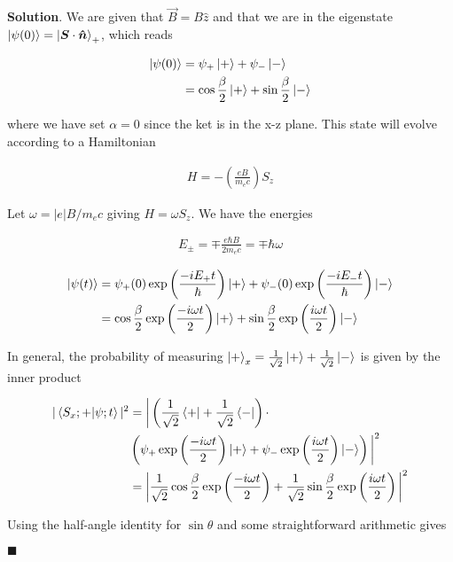 \documentclass[12pt]{article}
\theoremstyle{definition}
\newenvironment{s}{%
        \begin{trivlist} \item \textbf{Solution}. }{%
            \hspace*{\fill} $\blacksquare$\end{trivlist}}%
\begin{document}
{\begin{s}
We are given that $\vec{B} = B\hat{z}$ and that we are in the eigenstate $\ket{\psi(0)} = \ket{\bm{S}\cdot \bm{\hat{n}}}_{+}$, which reads

\begin{align*}
\ket{\psi(0)} &= \psi_{+}\ket{+} + \psi_{-}\ket{-}\\
&= \cos{\frac{\beta}{2}}\ket{+} + \sin{\frac{\beta}{2}}\ket{-}\\
\end{align*}

where we have set $\alpha=0$ since the ket is in the x-z plane. This state will evolve according to a Hamiltonian

\begin{align*}
H = -\left(\frac{eB}{m_{e}c}\right)S_{z}
\end{align*}

Let $\omega = |e|B/m_{e}c$ giving $H=\omega S_{z}$. We have the energies

\begin{align*}
E_{\pm} = \mp \frac{e\hbar B}{2m_{e}c} = \mp \hbar\omega
\end{align*}

\begin{align*}
\ket{\psi(t)} &= \psi_{+}(0)\exp\left(\frac{-iE_{+}t}{\hbar}\right)\ket{+} + \psi_{-}(0)\exp\left(\frac{-iE_{-}t}{\hbar}\right)\ket{-}\\
&= \cos{\frac{\beta}{2}}\exp\left(\frac{-i\omega t}{2}\right)\ket{+} + \sin{\frac{\beta}{2}}\exp\left(\frac{i\omega t}{2}\right)\ket{-}
\end{align*}

In general, the probability of measuring $\ket{+}_{x} = \frac{1}{\sqrt{2}}\ket{+} + \frac{1}{\sqrt{2}}\ket{-}$ is given by the inner product

\begin{align*}
|\bra{S_{x};+}\ket{\psi;t}|^{2} &= \bigg|\left(\frac{1}{\sqrt{2}}\bra{+} + \frac{1}{\sqrt{2}}\bra{-}\right)\cdot\\
&\left(\psi_{+}\exp\left(\frac{-i\omega t}{2}\right)\ket{+} + \psi_{-}\exp\left(\frac{i\omega t}{2}\right)\ket{-}\right)\bigg|^{2}\\
&= \bigg|\frac{1}{\sqrt{2}}\cos\frac{\beta}{2}\exp\left(\frac{-i\omega t}{2}\right)+\frac{1}{\sqrt{2}}\sin\frac{\beta}{2}\exp\left(\frac{i\omega t}{2}\right)\bigg|^{2}
\end{align*}

Using the half-angle identity for $\sin\theta$ and some straightforward arithmetic gives


\end{s}}
\end{document}
